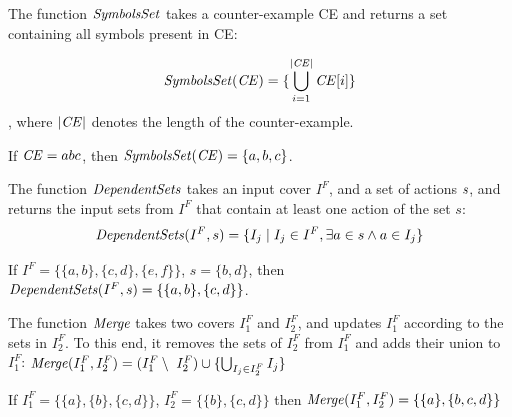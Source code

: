 \begin{definition}[SymbolsSet] \label{def:symbolset}
	The function  $\it SymbolsSet$  takes a counter-example CE and returns a set containing  all symbols present  in CE:
	
	
    	\[{\it SymbolsSet}({\it CE})=\{
	\bigcup_{i=1}^{|{\it CE}|}{{\it CE}[i]}\} \]
  , where $|{\it CE}|$ denotes the length of the counter-example.
\end{definition}

\begin{example*}
		If ${\it CE}=abc$, then  ${\it SymbolsSet}({\it CE})=\{a,b,c\}$.
	\end{example*}
\begin{definition}[DependentSets] \label{def:dependset}
	The function  $\it DependentSets$  takes an input cover
	$I^F$, and a set of actions $\it s$, and returns the input sets from $I^F$ that contain at least one  action of the set $s$:	
	\[{\it DependentSets}(I^F,s)=
	\{I_j\mid I_j\in I^F,\exists a\in s\wedge a\in I_j \}\]
 
\end{definition}

	
	\begin{example*}
		If $I^F=\{\{a,b\},\{c,d\},\{e,f\}\}$,  $s=\{b,d\}$, then  ${\it DependentSets}(I^F,s)=\{\{a,b\},\{c,d\}\}$.
	\end{example*}
	\begin{definition}[Merge] 	The function ${\it Merge}$	takes two covers $I^{F}_1$ and $I^{F}_2$, and updates $I^{F}_1$ according to the sets in $I^{F}_2$. To this end, it removes the sets of $I^{F}_2$ from $I^{F}_1$ and adds their union to $I^{F}_1$:
		  ${\it Merge}(I^{F}_1,I^{F}_2)= 
		(I^{F}_1\setminus\  I^{F}_2)\cup\{\bigcup_{I_j\in I^{F}_2} I_j\}$
	\end{definition}
	\begin{example*}
		If $I^{F}_1=\{\{a\},\{b\},\{c,d\}\}$, $I^{F}_2=\{\{b\},\{c,d\}\}$ then ${\it Merge}(I^{F}_1,I^{F}_2)=\{\{a\},\{b,c,d\}\}$
	\end{example*}
	
